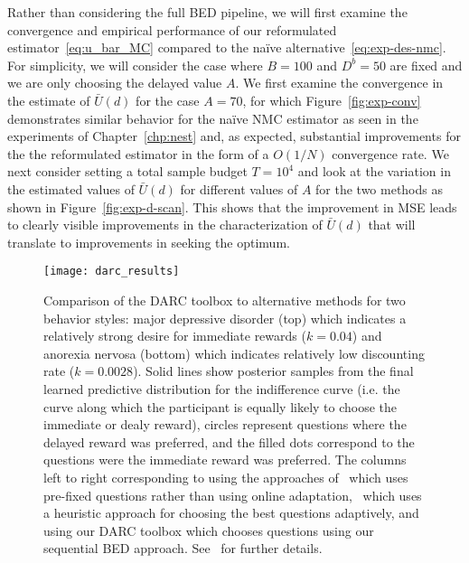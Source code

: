 Rather than considering the full BED pipeline, we will first examine the convergence and empirical
performance of our
reformulated estimator~\eqref{eq:u_bar_MC}  compared to the na\"{i}ve alternative~\eqref{eq:exp-des-nmc}.
For simplicity, we will consider the case 
where $B=100$ and $D^b = 50$ are fixed and we are only choosing the delayed value $A$.
We first examine the convergence in the estimate of $\bar{U}(d)$ for the case $A=70$,
for which Figure~\ref{fig:exp-conv} demonstrates similar behavior for the na\"{i}ve NMC estimator
as seen in the experiments of Chapter~\ref{chp:nest} and, as expected, substantial improvements
for the the reformulated estimator in the form of a $O(1/N)$ convergence rate.
We next consider setting a total sample budget $T=10^4$ and look at the variation in the 
estimated values of $\bar{U}(d)$ for different values of $A$ for the two methods as 
shown in Figure~\ref{fig:exp-d-scan}. This shows that the improvement in MSE leads 
to clearly visible improvements in the characterization of $\bar{U}(d)$ that
will translate to improvements in seeking the optimum.

\begin{figure}[t]
	\centering
		\texttt{[image: darc\_results]}
	\caption{Comparison of the DARC toolbox to alternative methods for two behavior styles: major
		depressive disorder (top) which indicates a relatively strong desire for immediate rewards ($k=0.04$)
		and anorexia nervosa (bottom) which indicates relatively low discounting rate ($k=0.0028$).  Solid lines show
		posterior samples from the final learned predictive distribution for the indifference curve (i.e. the curve
		along which the participant is equally likely to choose the immediate or dealy reward), circles represent
		questions where the delayed reward was preferred, and the filled dots correspond to the questions were
		the immediate reward was preferred.  The columns left to right corresponding to using the approaches
		of~\cite{Kirby:2009eu} which uses pre-fixed questions rather than using online adaptation,~\cite{Frye:2016eu}
		which uses a heuristic approach for choosing the best questions adaptively, and using our DARC toolbox
		which chooses questions using our sequential BED approach.  See~\cite{vincent2017darc} for further details.
		\label{fig:design:darc}
	}
\end{figure}

